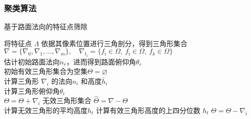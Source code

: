 \subsubsection{聚类算法}
\begin{algorithm}
    \caption{基于路面法向的特征点筛除}
    将特征点 $\Lambda$ 依据其像素位置进行三角剖分，得到三角形集合$\nabla =\{\nabla_0,\nabla_1,...,\nabla_m\},\quad \nabla_{t_i}=\{f_i\in\Omega,\ f_i\in\Omega,\ f_k\in\Omega\}$\\
    估计初始路面法向$n_{r}$，进而得到路面俯仰角$\theta_r$\\
    初始有效三角形集合为空集$\Theta = \varnothing$\\
    {   
        计算三角形 $\nabla_i$ 的法向$n_i$ 和高度$\bar{h}_i$\\
        计算三角形俯仰角$\theta_i$\\
        {
            $\Theta = \Theta + {\nabla_i}$
        }
    }
    {
    无效三角形集合 $\hat{\Theta} = \nabla - \Theta$\\
    计算无效三角形的平均高度$h_t$
    }
    {
        计算有效三角形高度的上四分位数 $h_t$
    }
    {   
        {
            $\Theta = \Theta - {\nabla_i}$
        }
    }
\end{algorithm}

